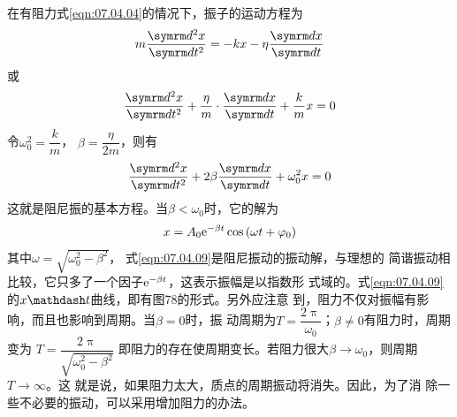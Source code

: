 在有阻力\lhbrak 式\eqref{eqn:07.04.04}\rhbrak 的情况下，振子的运动方程为
\begin{equation*}
  m \frac { \dif ^ { 2 } x } { \dif t ^ { 2 } } = - k x - \eta \frac { \dif x } { \dif t }
\end{equation*}
或
\begin{equation*}
  \frac { \dif ^ { 2 } x } { \dif t ^ { 2 } } + \frac { \eta } { m } \cdot \frac { \dif x } { \dif t } + \frac { k } { m } x = 0
\end{equation*}
令$ \omega _ 0 ^ { 2 } = \dfrac { k } { m } $， $ \beta = \dfrac { \eta } { 2 m } $，则有
\begin{equation}\label{eqn:07.04.08}
  \frac { \dif ^ { 2 } x } { \dif t ^ { 2 } } + 2 \beta \frac { \dif x } { \dif t } + \omega _ { 0 } ^ { 2 } x = 0
\end{equation}
这就是阻尼振的基本方程。当$ \beta < \omega _ { 0 } $时，它的解为
\begin{equation}\label{eqn:07.04.09}
  x = A _ { 0 } \mathrm e ^ { - \beta t } \cos \left( \omega t + \varphi _ { 0 } \right)
\end{equation}
其中$\omega = \sqrt { \omega _ 0 ^ { 2 } - \beta ^ { 2 } } $， 式\eqref{eqn:07.04.09}是阻尼振动的振动解，与理想的
简谐振动相比较，它只多了一个因子$ \mathrm e ^ { - \beta t } $，这表示振幅是以指数形
式域的。式\eqref{eqn:07.04.09}的$ x \mathdash t $曲线，即有图78的形式。另外应注意
到，阻力不仅对振幅有影响，而且也影响到周期。当$ \beta = 0 $时，振
动周期为$ T = \dfrac { 2 \uppi } { \omega _ { 0 } } $；$ \beta \ne 0 $有阻力时，周期变为
$ T = \dfrac { 2 \uppi } { \sqrt { \omega _ { 0 } ^ { 2 } - \beta ^ { 2 } } } $
即阻力的存在使周期变长。若阻力很大$ \beta \to \omega _ { 0 } $，则周期$ T \to \infty $。这
就是说，如果阻力太大，质点的周期振动将消失。因此，为了消
除一些不必要的振动，可以采用增加阻力的办法。
